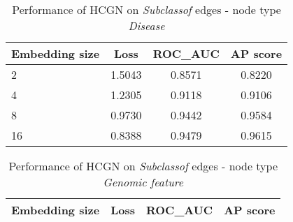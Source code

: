 \begin{table}[h]
    \centering
    \begin{tabular}{lccc}        
        \toprule
        \textbf{Embedding size} & \textbf{Loss} & \textbf{ROC\_AUC} & \textbf{AP score} \\
        \midrule
        2 & 1.5043 & 0.8571 & 0.8220 \\
        4 & 1.2305 & 0.9118 & 0.9106 \\
        8 & 0.9730 & 0.9442 & 0.9584 \\
        16 & 0.8388 & 0.9479 & 0.9615 \\
        \bottomrule
    \end{tabular}
    \caption{Performance of HCGN on \textit{Subclassof} edges - node type \textit{Disease}}
\end{table}

\begin{table}[h]
    \centering
    \begin{tabular}{lccc}        
        \toprule
        \textbf{Embedding size} & \textbf{Loss} & \textbf{ROC\_AUC} & \textbf{AP score} \\
        \midrule
        \bottomrule
    \end{tabular}
    \caption{Performance of HCGN on \textit{Subclassof} edges - node type \textit{Genomic feature}}
\end{table}

